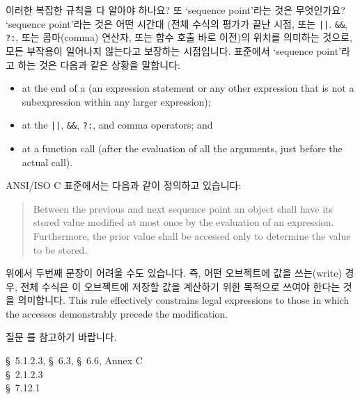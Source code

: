 \begin{faq}
	이러한 복잡한 규칙을 다 알아야 하나요? 또 `sequence point'라는
	것은 무엇인가요?
\A
	`sequence point'라는 것은 어떤 시간대 (전체 수식의 평가가 끝난
	시점, 또는 \verb+||+.  \verb+&&+, \verb+?:+, 또는 콤마(comma)
	연산자, 또는 함수 호출 바로 이전)의 위치를 의미하는 것으로, 
	모든 부작용이 일어나지 않는다고 보장하는 시점입니다. 표준에서 `sequence
        point'라고 하는 것은 다음과 같은 상황을 말합니다:
\begin{itemize}
        \item at the end of a  (an expression
        statement or any other expression that is not a subexpression
        within any larger expression);
        \item at the \verb+||+, \verb+&&+, \verb+?:+, and comma
        operators; and
        \item at a function call (after the evaluation of all the arguments,
        just before the actual call).
\end{itemize}

        ANSI/ISO C 표준에서는 다음과 같이 정의하고 있습니다:

\begin{quote}
	Between the previous and next sequence point an
	object shall have its stored value modified at
	most once by the evaluation of an expression.
	Furthermore, the prior value shall be accessed
	only to determine the value to be stored.
\end{quote}
	\noindent
	위에서 두번째 문장이 어려울 수도 있습니다.  즉, 어떤 오브젝트에 값을
	쓰는(write) 경우, 전체 수식은 이 오브젝트에 저장할 값을 계산하기
	위한 목적으로 쓰여야 한다는 것을 의미합니다.
	This rule
	effectively constrains legal expressions to those in which the
	accesses demonstrably precede the modification.

	질문 를 참고하기 바랍니다.

\R
	\cite{c89} \S\ 5.1.2.3, \S\ 6.3, \S\ 6.6, Annex C \\
	\cite{rationale} \S\ 2.1.2.3 \\
	\cite{hs} \S\ 7.12.1 
\end{faq}

